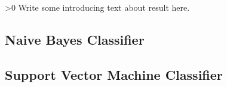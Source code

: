 \ifnum\printdraft>0
	Write some introducing text about result here.
\fi

\subsection{Naive Bayes Classifier}

\subsection{Support Vector Machine Classifier}
